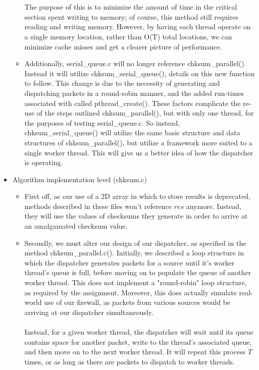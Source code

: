 \documentclass[]{article}
\begin{document}
\begin{itemize}
\begin{itemize}
		\\\\
		The purpose of this is to minimize the amount of time in the critical section spent writing to memory; of course, this method still requires reading and writing memory. However, by having each thread operate on a single memory location, rather than O(T) total locations, we can minimize cache misses and get a clearer picture of performance.
		\item Additionally, serial\_queue.c will no longer reference chksum\_parallel(). Instead it will utilize chksum\_serial\_queue(), details on this new function to follow. This change is due to the necessity of generating and dispatching packets in a round-robin manner, and the added run-times associated with called pthread\_create(). These factors complicate the re-use of the steps outlined chksum\_parallel(), but with only one thread, for the purposes of testing serial\_queue.c. So instead, chksum\_serial\_queue() will utilize the same basic structure and data structures of chksum\_parallel(), but utilize a framework more suited to a single worker thread. This will give us a better idea of how the dispatcher is operating.
	\end{itemize}
	\item Algorithm implementation level (chksum.c)
	\begin{itemize}
		\item First off, as our use of a 2D array in which to store results is deprecated, methods described in these files won't reference $res$ anymore. Instead, they will use the values of checksums they generate in order to arrive at an amalgamated checksum value.
		\item Secondly, we must alter our design of our dispatcher, as specified in the method chksum\_parallel.c(). Initially, we described a loop structure in which the dispatcher generates packets for a source until it's worker thread's queue is full, before moving on to populate the queue of another worker thread. This does not implement a "round-robin" loop structure, as required by the assignment. Moreover, this does actually simulate real-world use of our firewall, as packets from various sources would be arriving at our dispatcher simultaneously.
		\\\\
		Instead, for a given worker thread, the dispatcher will wait until its queue contains space for another packet, write to the thread's associated queue, and then move on to the next worker thread. It will repeat this process $T$ times, or as long as there are packets to dispatch to worker threads.

\end{itemize}
\end{itemize}
\end{document}
